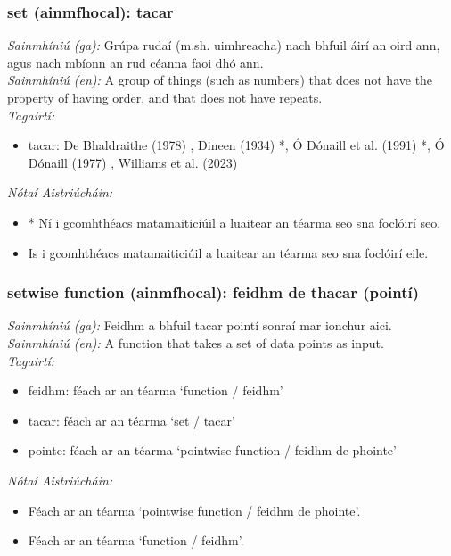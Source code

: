 \subsubsection*{set (ainmfhocal): tacar}
 \noindent \textit{Sainmhíniú (ga):} Grúpa rudaí (m.sh. uimhreacha) nach bhfuil áirí an oird ann, agus nach mbíonn an rud céanna faoi dhó ann.
\\
 \noindent \textit{Sainmhíniú (en):} A group of things (such as numbers) that does not have the property of having order, and that does not have repeats.
\\
 \noindent \textit{Tagairtí:}
\begin{itemize}
	\item tacar: De Bhaldraithe (1978) \cite{de-bhaldraithe}, Dineen (1934) \cite{dineen}*, Ó Dónaill et al. (1991) \cite{focloir-beag}*, Ó Dónaill (1977) \cite{odonaill}, Williams et al. (2023) \cite{storchiste}
\end{itemize}

 \noindent \textit{Nótaí Aistriúcháin:}
\begin{itemize}
	\item * Ní i gcomhthéacs matamaiticiúil a luaitear an téarma seo sna foclóirí seo.
	\item Is i gcomhthéacs matamaiticiúil a luaitear an téarma seo sna foclóirí eile.
\end{itemize}


\subsubsection*{setwise function (ainmfhocal): feidhm de thacar (pointí)}
 \noindent \textit{Sainmhíniú (ga):} Feidhm a bhfuil tacar pointí sonraí mar ionchur aici.
\\
 \noindent \textit{Sainmhíniú (en):} A function that takes a set of data points as input.
\\
 \noindent \textit{Tagairtí:}
\begin{itemize}
	\item feidhm: féach ar an téarma `function / feidhm'
	\item tacar: féach ar an téarma `set / tacar'
	\item pointe: féach ar an téarma `pointwise function / feidhm de phointe'
\end{itemize}

 \noindent \textit{Nótaí Aistriúcháin:}
\begin{itemize}
	\item Féach ar an téarma `pointwise function / feidhm de phointe'.
	\item Féach ar an téarma `function / feidhm'.
\end{itemize}


